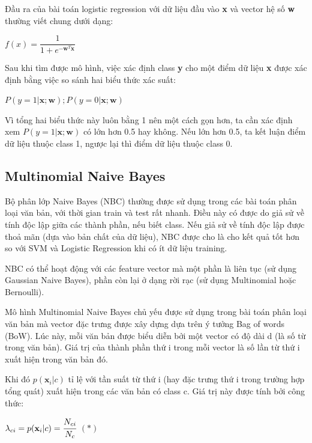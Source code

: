 \documentclass[12pt,a4paper,oneside]{book}
\begin{document}
			Đầu ra của bài toán logistic regression với dữ liệu đầu vào \textbf{x} và vector hệ số \textbf{w} thường viết chung dưới dạng:
			
			\begin{center}
				$f(x) = \dfrac{1}{1+e^{-\textbf{w}^T\textbf{x}}}$
			\end{center}
			
			Sau khi tìm được mô hình, việc xác định class \textbf{y} cho một điểm dữ liệu \textbf{x} được xác định bằng việc so sánh hai biểu thức xác suất:
			
			\begin{center}
				$P(y=1|\textbf{x};\textbf{w}); P(y=0|\textbf{x};\textbf{w})$
			\end{center}
			
			Vì tổng hai biểu thức này luôn bằng 1 nên một cách gọn hơn, ta cần xác định xem $P(y=1|\textbf{x};\textbf{w})$ có lớn hơn 0.5 hay không. Nếu lớn hơn 0.5, ta kết luận điểm dữ liệu thuộc class 1, ngược lại thì điểm dữ liệu thuộc class 0.
			
		\subsection{Multinomial Naive Bayes}
			Bộ phân lớp Naive Bayes (NBC) thường được sử dụng trong các bài toán phân loại văn bản, với thời gian train và test rất nhanh. Điều này có được do giả sử về tính độc lập giữa các thành phần, nếu biết class. Nếu giả sử về tính độc lập được thoả mãn (dựa vào bản chất của dữ liệu), NBC được cho là cho kết quả tốt hơn so với SVM và Logistic Regression khi có ít dữ liệu training.

			NBC có thể hoạt động với các feature vector mà một phần là liên tục (sử dụng Gaussian Naive Bayes), phần còn lại ở dạng rời rạc (sử dụng Multinomial hoặc Bernoulli).

			Mô hình Multinomial Naive Bayes chủ yếu được sử dụng trong bài toán phân loại văn bản mà vector đặc trưng được xây dựng dựa trên ý tưởng Bag of words (BoW). Lúc này, mỗi văn bản được biểu diễn bởi một vector có độ dài d (là số từ trong văn bản). Giá trị của thành phần thứ i trong mỗi vector là số lần từ thứ i xuất hiện trong văn bản đó.

			Khi đó $p(\textbf{x}_i|c)$ tỉ lệ với tần suất từ thứ i (hay đặc trưng thứ i trong trường hợp tổng quát) xuất hiện trong các văn bản có class c. Giá trị này được tính bởi công thức:
			
			\begin{center}
				$\lambda_{ci} = p(\textbf{x}_i|c) = \cfrac{N_{ci}}{N_c}$    $(*)$
			\end{center}
			
\end{document}
